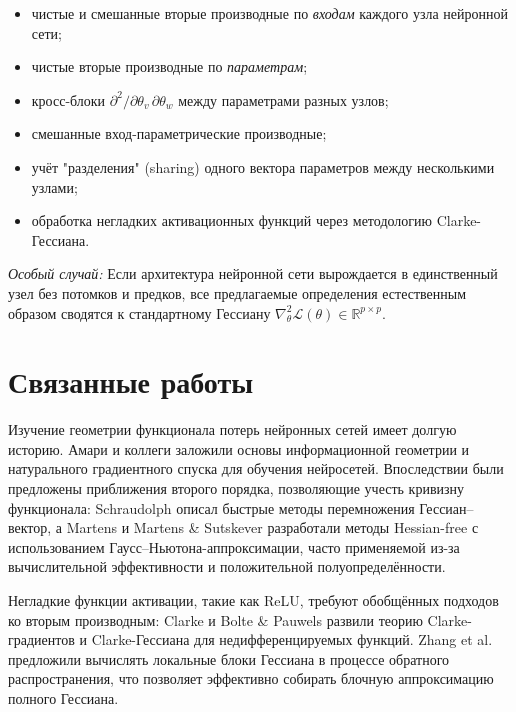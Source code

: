 \documentclass[11pt]{article}
\begin{document}
\begin{itemize}
  \item чистые и смешанные вторые производные по \emph{входам} каждого узла нейронной сети;
  \item чистые вторые производные по \emph{параметрам};
  \item кросс-блоки $\partial^2/\partial\theta_v\,\partial\theta_w$ между параметрами разных узлов;
  \item смешанные вход-параметрические производные;
  \item учёт "разделения" (sharing) одного вектора параметров между несколькими узлами;
  \item обработка негладких активационных функций через методологию Clarke-Гессиана.
\end{itemize}

\emph{Особый случай:} Если архитектура нейронной сети вырождается в единственный узел без потомков и предков,
все предлагаемые определения естественным образом сводятся к стандартному Гессиану $\nabla^2_\theta\mathcal
L(\theta)\in\mathbb{R}^{p\times p}$.

\section{Связанные работы}

Изучение геометрии функционала потерь нейронных сетей имеет долгую историю. Амари и коллеги
\citep{amari1998natural, heskes2000natural} заложили основы информационной геометрии и
натурального градиентного спуска для обучения нейросетей. Впоследствии были предложены
приближения второго порядка, позволяющие учесть кривизну функционала: Schraudolph
\citep{schraudolph2002fast} описал быстрые методы перемножения Гессиан–вектор, а Martens
\citep{martens2010deep} и Martens \& Sutskever \citep{martens2012training} разработали
методы Hessian-free с использованием Гаусс–Ньютона-аппроксимации, часто применяемой из-за
вычислительной эффективности и положительной полуопределённости.

Негладкие функции активации, такие как ReLU, требуют обобщённых подходов ко вторым
производным: Clarke \citep{clarke1990optimization} и Bolte \& Pauwels
\citep{bolte2020conservative} развили теорию Clarke-градиентов и Clarke-Гессиана для
недифференцируемых функций. Zhang et al. \citep{zhang2018local} предложили вычислять
локальные блоки Гессиана в процессе обратного распространения, что позволяет эффективно
собирать блочную аппроксимацию полного Гессиана.
\end{document}
